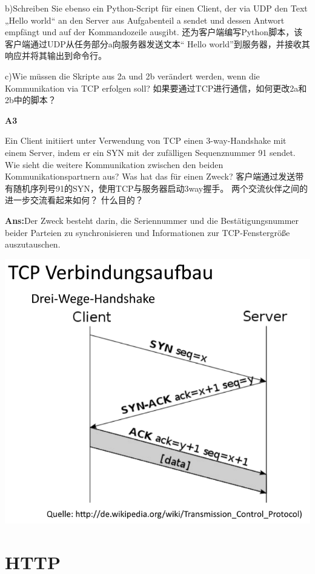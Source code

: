 \documentclass[fleqn]{article}
\begin{document}
b)Schreiben Sie ebenso ein Python-Script für einen Client, der via UDP den Text „Hello world“ an den Server aus Aufgabenteil a sendet und dessen Antwort empfängt und auf der Kommandozeile ausgibt.
还为客户端编写Python脚本，该客户端通过UDP从任务部分a向服务器发送文本“ Hello world”到服务器，并接收其响应并将其输出到命令行。

c)Wie müssen die Skripte aus 2a und 2b verändert werden, wenn die Kommunikation via TCP erfolgen soll?
如果要通过TCP进行通信，如何更改2a和2b中的脚本？

\noindent\textbf{A3}

Ein Client initiiert unter Verwendung von TCP einen 3-way-Handshake mit einem Server, indem er ein SYN mit der zufälligen Sequenznummer 91 sendet. Wie sieht die weitere Kommunikation zwischen den beiden Kommunikationspartnern aus? Was hat das für einen Zweck?
客户端通过发送带有随机序列号91的SYN，使用TCP与服务器启动3way握手。 两个交流伙伴之间的进一步交流看起来如何？ 什么目的？

\textbf{Ans:}Der Zweck besteht darin, die Seriennummer und die Bestätigungsnummer beider Parteien zu synchronisieren und Informationen zur TCP-Fenstergröße auszutauschen.

\begin{center}
    \includegraphics[scale=0.5]{bild18.png}
\end{center}

\clearpage
\section{HTTP}
\end{document}
